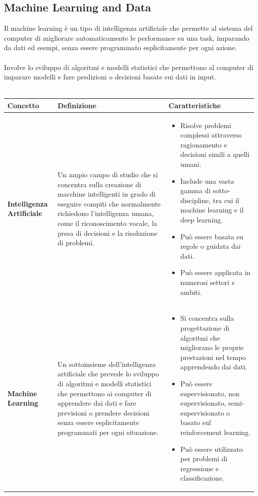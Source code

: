 \documentclass[../main.tex]{subfiles}
\begin{document}
	\subsection{Machine Learning and Data}
	Il machine learning è un tipo di intelligenza artificiale che permette al sistema del computer di migliorare automaticamente le performance su una task, imparando da dati ed esempi, senza essere programmato esplicitamente per ogni azione.\\\\
	Involve lo sviluppo di algoritmi e modelli statistici che permettono al computer di imparare modelli e fare predizioni o decisioni basate sui dati in input.\\\\
	\begin{tabular}{|p{2cm}|p{6cm}|p{7cm}|}
		\hline
		\textbf{Concetto} & \textbf{Definizione} & \textbf{Caratteristiche} \\
		\hline
		\textbf{Intelligenza Artificiale} &
		Un ampio campo di studio che si concentra sulla creazione di macchine intelligenti in grado di eseguire compiti che normalmente richiedono l'intelligenza umana, come il riconoscimento vocale, la presa di decisioni e la risoluzione di problemi. &
		\begin{itemize}
			\item Risolve problemi complessi attraverso ragionamento e decisioni simili a quelli umani.
			\item Include una vasta gamma di sotto-discipline, tra cui il machine learning e il deep learning.
			\item Può essere basata su regole o guidata dai dati.
			\item Può essere applicata in numerosi settori e ambiti.
		\end{itemize}\\
		\hline
		\textbf{Machine Learning} &
		Un sottoinsieme dell'intelligenza artificiale che prevede lo sviluppo di algoritmi e modelli statistici che permettono ai computer di apprendere dai dati e fare previsioni o prendere decisioni senza essere esplicitamente programmati per ogni situazione. &
		\begin{itemize}
			\item Si concentra sulla progettazione di algoritmi che migliorano le proprie prestazioni nel tempo apprendendo dai dati.
			\item Può essere supervisionato, non supervisionato, semi-supervisionato o basato sul reinforcement learning.
			\item Può essere utilizzato per problemi di regressione e classificazione.

\end{itemize}
\end{tabular}
\end{document}
